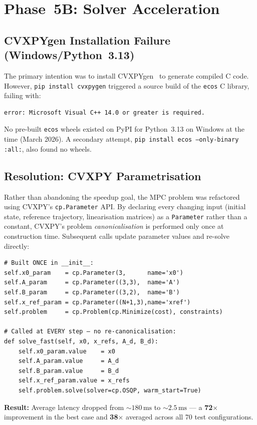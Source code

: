 \documentclass[12pt,a4paper,oneside]{report}
\begin{document}
\section{Phase~5B: Solver Acceleration}\label{sec:phase5b}

\subsection{CVXPYgen Installation Failure (Windows/Python~3.13)}

The primary intention was to install CVXPYgen~\cite{schaller2022} to
generate compiled C code. However, \texttt{pip install cvxpygen} triggered
a source build of the \texttt{ecos} C library, failing with:
\begin{verbatim}
error: Microsoft Visual C++ 14.0 or greater is required.
\end{verbatim}
No pre-built \texttt{ecos} wheels existed on PyPI for Python~3.13 on
Windows at the time (March 2026). A secondary attempt,
\texttt{pip install ecos --only-binary :all:}, also found no wheels.

\subsection{Resolution: CVXPY Parametrisation}

Rather than abandoning the speedup goal, the MPC problem was refactored
using CVXPY's \texttt{cp.Parameter} API. By declaring every changing input
(initial state, reference trajectory, linearisation matrices) as a
\texttt{Parameter} rather than a constant, CVXPY's problem
\textit{canonicalisation} is performed only once at construction time.
Subsequent calls update parameter values and re-solve directly:
\begin{lstlisting}[caption={Parametrised CVXPY problem in \texttt{cvxpygen\_solver.py}}]
# Built ONCE in __init__:
self.x0_param    = cp.Parameter(3,      name='x0')
self.A_param     = cp.Parameter((3,3),  name='A')
self.B_param     = cp.Parameter((3,2),  name='B')
self.x_ref_param = cp.Parameter((N+1,3),name='xref')
self.problem     = cp.Problem(cp.Minimize(cost), constraints)

# Called at EVERY step — no re-canonicalisation:
def solve_fast(self, x0, x_refs, A_d, B_d):
    self.x0_param.value    = x0
    self.A_param.value     = A_d
    self.B_param.value     = B_d
    self.x_ref_param.value = x_refs
    self.problem.solve(solver=cp.OSQP, warm_start=True)
\end{lstlisting}
\textbf{Result:} Average latency dropped from \(\sim\!180\,\text{ms}\)
to \(\sim\!2.5\,\text{ms}\) --- a \textbf{72$\times$} improvement in the
best case and \textbf{38$\times$} averaged across all 70 test configurations.
\end{document}
